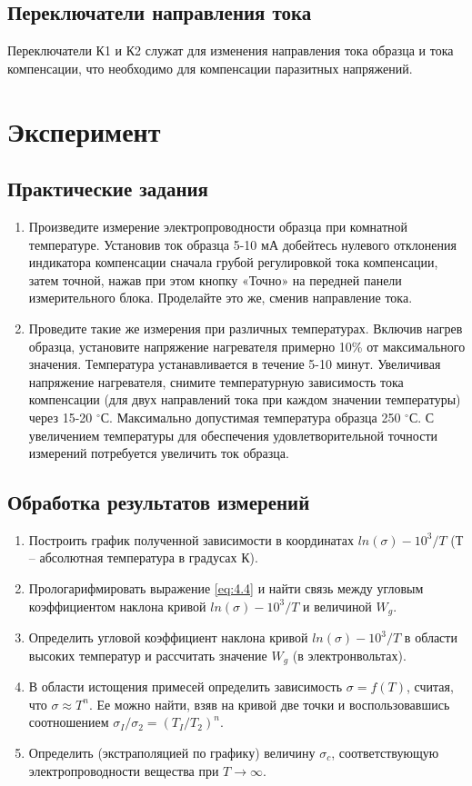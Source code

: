 \subsection{Переключатели направления тока}
Переключатели К1 и К2 служат для изменения направления тока образца и тока компенсации, что необходимо для компенсации паразитных напряжений.

\section*{Эксперимент}
\subsection*{Практические задания}

\begin{enumerate}
	\item Произведите измерение электропроводности образца при комнатной температуре. Установив ток образца 5-10 мА
	добейтесь нулевого отклонения индикатора компенсации сначала грубой регулировкой тока компенсации, затем точной,
	нажав при этом кнопку «Точно» на передней панели измерительного блока. Проделайте это же, сменив направление тока.
	\item Проведите такие же измерения при различных температурах. Включив нагрев образца, установите напряжение
	нагревателя примерно 10\% от максимального значения. Температура устанавливается в течение 5-10 минут. Увеличивая
	напряжение нагревателя, снимите температурную зависимость тока компенсации (для двух направлений тока при каждом
	значении температуры) через 15-20 $^{\circ}$С. Максимально допустимая температура образца 250 $^{\circ}$С.
	С увеличением температуры для обеспечения удовлетворительной точности измерений потребуется увеличить ток образца.
\end{enumerate} 

\subsection*{Обработка результатов измерений}
\begin{enumerate}
	\item Построить график полученной зависимости в координатах $ln(\sigma)-10^3/T$ (Т – абсолютная температура в градусах К).
	\item Прологарифмировать выражение \eqref{eq:4.4} и найти связь между угловым коэффициентом наклона кривой
	$ln(\sigma)-10^3/T$ и величиной $W_g$.
	\item Определить угловой коэффициент наклона кривой $ln(\sigma)-10^3/T$ в области высоких температур и рассчитать
	значение $W_g$ (в электронвольтах).
	\item В области истощения примесей определить зависимость $\sigma = f(T)$, считая, что $\sigma \approx T^n$. Ее
	можно найти, взяв на кривой две точки и воспользовавшись соотношением $\sigma_{I} / \sigma_{2}=\left(T_{I} /
	T_{2}\right)^{n}$.
	\item Определить (экстраполяцией по графику) величину $\sigma_c$, соответствующую
	электропроводности вещества при $T \to \infty$.
\end{enumerate}

